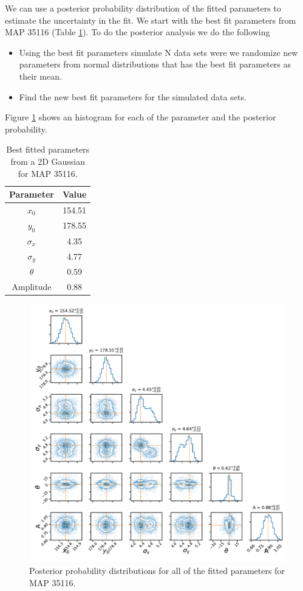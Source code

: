 We can use a posterior probability distribution of the fitted parameters to estimate the uncertainty in the fit. We start with the best fit parameters from MAP 35116 (Table \ref{tab:lmtMap2}). To do the posterior analysis we do the following
\begin{itemize}
    \item Using the best fit parameters simulate N data sets were we randomize new parameters from normal distributions that has the best fit parameters as their mean.
    \item Find the new best fit parameters for the simulated data sets.
\end{itemize}

Figure \ref{fig:lmtpostAna} shows an histogram for each of the parameter and the posterior probability. 

\begin{table}[h]
    \centering
    \begin{tabular}{|c|c|}
        \toprule
         Parameter & Value  \\
         \midrule
         $x_0$       & 154.51 \\
         $y_0$       & 178.55 \\
         $\sigma_x$  & 4.35   \\
         $\sigma_y$  & 4.77   \\
         $\theta$    & 0.59   \\
         Amplitude   & 0.88   \\
         \bottomrule
    \end{tabular}
    \caption{Best fitted parameters from a 2D Gaussian for MAP 35116.}
    \label{tab:lmtMap2}
\end{table}


\begin{figure}
    \centering
    \includegraphics{CodeAndFigures/FocusingLMTPosteriorCorner.pdf}
    \caption{Posterior probability distributions for all of the fitted parameters for MAP 35116.}
    \label{fig:lmtpostAna}
\end{figure}

